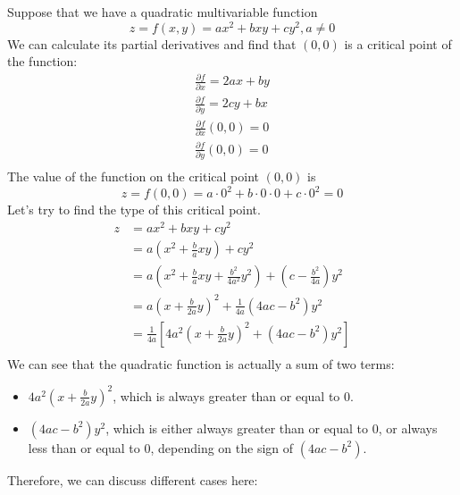 \documentclass{article}
\begin{document}
Suppose that we have a quadratic multivariable function 
\begin{equation*}
  z = f(x, y) = ax^2 + bxy + cy^2, a \neq 0
\end{equation*}
We can calculate its partial derivatives and find that $(0, 0)$ is a critical 
point of the function:
\begin{gather*}
  \frac{\partial f}{\partial x} = 2ax + by \\
  \frac{\partial f}{\partial y} = 2cy + bx \\
  \frac{\partial f}{\partial x}(0, 0) = 0 \\
  \frac{\partial f}{\partial y}(0, 0) = 0 \\
\end{gather*}
The value of the function on the critical point $(0, 0)$ is 
\begin{equation*}
  z = f(0, 0) = a \cdot 0^2 + b \cdot 0 \cdot 0 + c \cdot 0^2 = 0
\end{equation*}
Let's try to find the type of this critical point.
\begin{equation*}
  \begin{split}
    z &= ax^2 + bxy + cy^2 \\
      &= a(x^2 + \frac{b}{a}xy) + cy^2 \\
      &= a(x^2 + \frac{b}{a}xy + \frac{b^2}{4a^2}y^2) + (c - \frac{b^2}{4a})y^2 \\
      &= a(x + \frac{b}{2a}y)^2 + \frac{1}{4a}(4ac - b^2)y^2 \\
      &= \frac{1}{4a}[4a^2(x + \frac{b}{2a}y)^2 + (4ac - b^2)y^2] \\
  \end{split}
\end{equation*}
We can see that the quadratic function is actually a sum of two terms:
\begin{itemize}
  \item $4a^2(x + \frac{b}{2a}y)^2$, which is always greater than or equal to 0.
  \item $(4ac - b^2)y^2$, which is either always greater than or equal to 0, or 
    always less than or equal to 0, depending on the sign of $(4ac - b^2)$.
\end{itemize}
Therefore, we can discuss different cases here:
\end{document}

